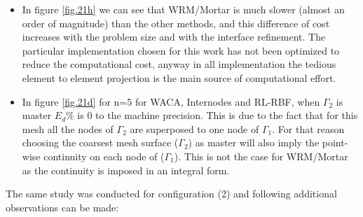 \begin{itemize}
     \item In figure \ref{fig.21h} we can see that WRM/Mortar is much slower (almost an order of magnitude) than the other methods, and this difference of cost increases with the problem size and with the interface refinement. The particular implementation chosen for this work has not been optimized to reduce the computational cost, anyway in all implementation the tedious element to element projection is the main source of computational effort.
     \item In figure \ref{fig.21d} for n=5 for WACA, Internodes and RL-RBF, when $\Gamma_2$ is master  $E_d \%$ is 0 to the machine precision. This is due to the fact that for this mesh all the nodes of $\Gamma_2$ are superposed to one node of $\Gamma_1$. For that reason choosing the coarsest mesh surface ($\Gamma_2$) as master will also imply the  point-wise continuity on each node of ($\Gamma_1$). This is not the case for WRM/Mortar as the continuity is imposed in an integral form.
 \end{itemize}
 The same study was conducted for configuration (2) and following additional observations can be made:
